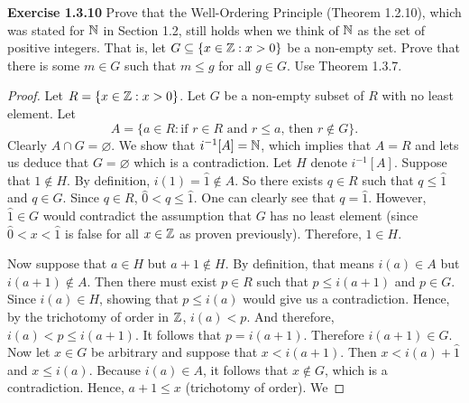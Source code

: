 \noindent \textbf{Exercise 1.3.10} Prove that the Well-Ordering Principle (Theorem 1.2.10), which was stated for \(\mathbb{N}\) in Section 1.2, still holds when
we think of \(\mathbb{N}\) as the set of positive integers. That is, let \(G \subseteq \{x \in \mathbb{Z} : x > 0\}\) be a non-empty set. Prove that there is some \(m \in G\) such that \(m \leq g\) for all \(g \in G\). Use Theorem 1.3.7.
\begin{proof}
    Let \(R = \{x \in \mathbb{Z} : x > 0\}\). Let \(G\) be a non-empty subset of \(R\) with no least element. Let \[A = \{a \in R : \text{if }r \in R\text{ and }r \leq a\text{, then }r\notin G\}.\]
    Clearly \(A \cap G = \varnothing\). We show that \(i^{-1}[A] = \mathbb{N}\), which implies that \(A = R\) and lets us deduce that \(G = \varnothing\) which is a contradiction. Let \(H\) denote \(i^{-1}[A]\). Suppose that \(1 \notin H\).
    By definition, \(i(1) = \hat{1} \notin A\). So there exists \(q \in R\) such that \(q \leq \hat{1}\) and \(q \in G\). Since \(q \in R\), \(\hat{0} < q \leq \hat{1}\).
    One can clearly see that \(q = \hat{1}\). However, \(\hat{1} \in G\) would contradict the assumption that \(G\) has no least element (since \(\hat{0} < x < \hat{1}\) is false for all \(x \in \mathbb{Z}\) as proven previously).
    Therefore, \(1 \in H\).
    \par Now suppose that \(a \in H\) but \(a+1 \notin H\). By definition, that means \(i(a) \in A\) but \(i(a+1) \notin A\). Then there must exist \(p \in R\) such that \(p \leq i(a+1)\) and \(p \in G\). Since \(i(a) \in H\), showing that \(p \leq i(a)\) would give us a contradiction.
    Hence, by the trichotomy of order in \(\mathbb{Z}\), \(i(a) < p\). And therefore, \(i(a) < p \leq i(a+1)\). It follows that \(p = i(a+1)\). Therefore \(i(a+1) \in G\). Now let \(x \in G\) be arbitrary
    and suppose that \(x < i(a+1)\). Then \(x < i(a) + \hat{1}\) and \(x \leq i(a)\). Because \(i(a) \in A\), it follows that \(x \notin G\), which is a contradiction. Hence, \(a + 1 \leq x\) (trichotomy of order). We
\end{proof}

